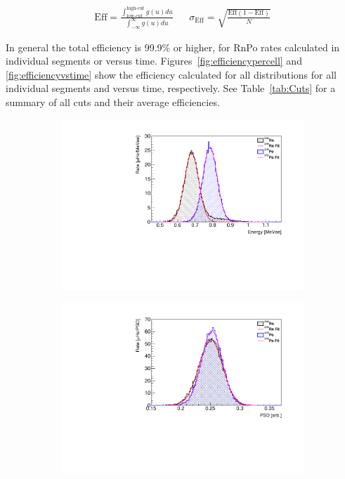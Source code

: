 \begin{align}
	\text{Eff} = \frac{\int_{\text{low-cut}}^{\text{high-cut}}g(u) du}{\int_{-\infty}^{\infty}g(u) du}
	&& \sigma_{\text{Eff}} =\sqrt{\frac{\text{Eff}(1-\text{Eff})}{N}}
	\label{eq:Eff}
\end{align}	

In general the total efficiency is 99.9\% or higher, for RnPo rates calculated in individual segments or versus time.
Figures~\ref{fig:efficiencypercell} and \ref{fig:efficiencyvstime} show the efficiency calculated for all distributions for all individual segments and versus time, respectively.
See Table~\ref{tab:Cuts} for a summary of all cuts and their average efficiencies.

\begin{figure}[H]
	\begin{subfigure}{0.5\linewidth}
	\centering
	\includegraphics[width=0.95\linewidth]{tex/6-ac227-images/AD_RateCalc/RnPoEn_Seg76}
	\caption{}
	\label{fig:rnpoenseg76}
\end{subfigure}%
\begin{subfigure}{0.5\linewidth}
	\centering
	\includegraphics[width=0.95\linewidth]{tex/6-ac227-images/AD_RateCalc/RnPoPSD_Seg76}

\end{subfigure}
\end{figure}
